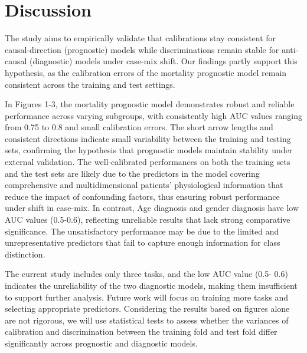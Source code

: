 \documentclass[10.7pt,]{article}
\begin{document}
\clearpage
\newpage
\section{Discussion}\label{discussion}

The study aims to empirically validate that calibrations stay consistent for causal-direction (prognostic) models while discriminations remain stable for anti-causal (diagnostic) models under case-mix shift. Our findings partly support this hypothesis, as the calibration errors of the mortality prognostic model remain consistent across the training and test settings. 
  
In Figures 1-3, the mortality prognostic model demonstrates robust and reliable performance across varying subgroups, with consistently high AUC values ranging from 0.75 to 0.8 and small calibration errors.  The short arrow lengths and consistent directions indicate small variability between the training and testing sets, confirming the hypothesis that prognostic models maintain stability under external validation.  The well-calibrated performances on both the training sets and the test sets are likely due to the predictors in the model covering comprehensive and multidimensional patients’ physiological information that reduce the impact of confounding factors, thus ensuring robust performance under shift in case-mix. In contrast, Age diagnosis and gender diagnosis have low AUC values (0.5-0.6), reflecting unreliable results that lack strong comparative significance. The unsatisfactory performance may be due to the limited and unrepresentative predictors that fail to capture enough information for class distinction. 
  
The current study includes only three tasks, and the low AUC value (0.5- 0.6) indicates the unreliability of the two diagnostic models, making them insufficient to support further analysis. Future work will focus on training more tasks and selecting appropriate predictors. Considering the results based on figures alone are not rigorous, we will use statistical tests to assess whether the variances of calibration and discrimination between the training fold and test fold differ significantly across prognostic and diagnostic models.

\newpage


\end{document}
